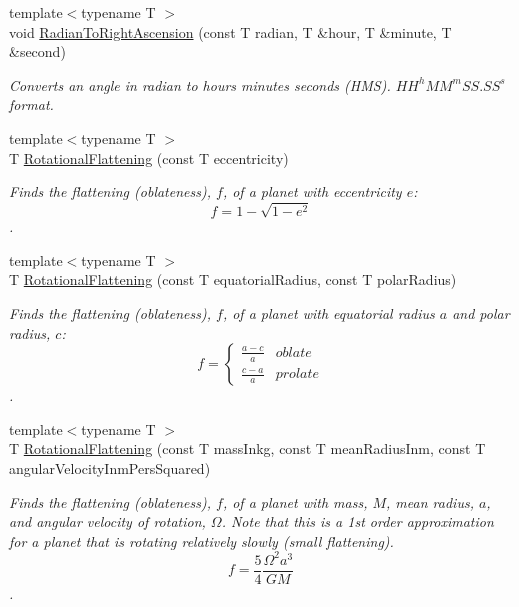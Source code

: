 \begin{DoxyCompactItemize}
{\footnotesize template$<$typename T $>$ }\\void \mbox{\hyperlink{group___e_g_x_phys-_astrophysics-_right_ascension_ga624dd87144a17d19d0100500c34da978}{Radian\+To\+Right\+Ascension}} (const T radian, T \&hour, T \&minute, T \&second)
\begin{DoxyCompactList}\small\item\em Converts an angle in radian to hours minutes seconds (H\+MS). ${HH}^h{MM}^m{SS.SS}^s$ format. \end{DoxyCompactList}\item 
{\footnotesize template$<$typename T $>$ }\\T \mbox{\hyperlink{group___e_g_x_phys-_astrophysics-_rotational_flattening_gabba90db442c4ec9e12523adb00d66c44}{Rotational\+Flattening}} (const T eccentricity)
\begin{DoxyCompactList}\small\item\em Finds the flattening (oblateness), $f$, of a planet with eccentricity $e$\+: \[ f = 1 - \sqrt{1-e^2} \]. \end{DoxyCompactList}\item 
{\footnotesize template$<$typename T $>$ }\\T \mbox{\hyperlink{group___e_g_x_phys-_astrophysics-_rotational_flattening_ga1840fed2081c35f68c4b8bfa75248977}{Rotational\+Flattening}} (const T equatorial\+Radius, const T polar\+Radius)
\begin{DoxyCompactList}\small\item\em Finds the flattening (oblateness), $f$, of a planet with equatorial radius $a$ and polar radius, $c$\+: \[ f =\begin{cases} \frac{a-c}{a}{} & oblate \\ \frac{c-a}{a} & prolate \end{cases} \]. \end{DoxyCompactList}\item 
{\footnotesize template$<$typename T $>$ }\\T \mbox{\hyperlink{group___e_g_x_phys-_astrophysics-_rotational_flattening_ga316b9afb6e1aa940fa96417c6f24ed4d}{Rotational\+Flattening}} (const T mass\+Inkg, const T mean\+Radius\+Inm, const T angular\+Velocity\+Inm\+Pers\+Squared)
\begin{DoxyCompactList}\small\item\em Finds the flattening (oblateness), $f$, of a planet with mass, $M$, mean radius, $a$, and angular velocity of rotation, $\Omega$. Note that this is a 1st order approximation for a planet that is rotating relatively slowly (small flattening). \[ f = \frac{5}{4} \frac{\Omega^2 a^3}{GM} \]. \end{DoxyCompactList}\item 

\end{DoxyCompactItemize}
